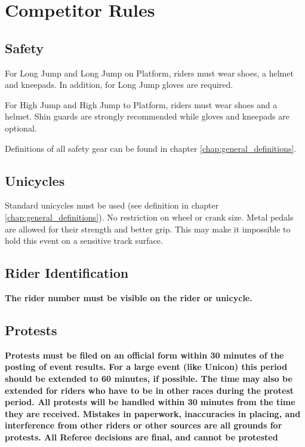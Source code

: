 \chapter{Competitor Rules}

\section{Safety}

For Long Jump and Long Jump on Platform, riders must wear shoes, a helmet and kneepads.
In addition, for Long Jump gloves are required.

For High Jump and High Jump to Platform, riders must wear shoes and a helmet.
Shin guards are strongly recommended while gloves and kneepads are optional.

Definitions of all safety gear can be found in chapter \ref{chap:general_definitions}.

\section{Unicycles}


Standard unicycles must be used (see definition in chapter \ref{chap:general_definitions}).
No restriction on wheel or crank size.
Metal pedals are allowed for their strength and better grip.
This may make it impossible to hold this event on a sensitive track surface.

\section{Rider Identification}

\textbf{The rider number must be visible on the rider or unicycle.}

\section{Protests}

\textbf{Protests must be filed on an official form within 30 minutes of the posting of event results. For a large event (like Unicon) this period should be extended to 60 minutes, if possible. The time may also be extended for riders who have to be in other races during the protest period. All protests will be handled within 30 minutes from the time they are received. Mistakes in paperwork, inaccuracies in placing, and interference from other riders or other sources are all grounds for protests. All Referee decisions are final, and cannot be protested}

